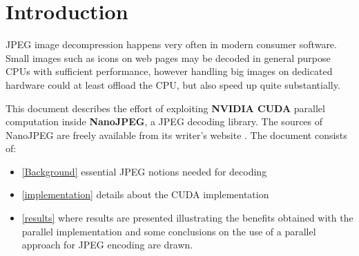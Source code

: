 \chapter{Introduction} \label{Intruduction}

JPEG image decompression happens very often in modern consumer software. Small images such as icons on web pages may be decoded in general purpose CPUs with sufficient performance, however handling big images on dedicated hardware could at least offload the CPU, but also speed up quite substantially.

This document describes the effort of exploiting \textbf{NVIDIA CUDA} parallel computation inside \textbf{NanoJPEG}, a JPEG decoding library. The sources of NanoJPEG are freely available from its writer's website \cite{nanojpeg_site}. The document consists of:
\begin{itemize}
    \item \autoref{Background} essential JPEG notions needed for decoding
    \item \autoref{implementation} details about the CUDA implementation
    \item \autoref{results} where results are presented illustrating the benefits obtained with the parallel implementation and some conclusions on the use of a parallel approach for JPEG encoding are drawn.
\end{itemize}
